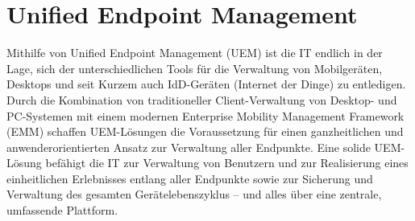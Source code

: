 \section{Unified Endpoint Management}
Mithilfe von Unified Endpoint Management (UEM) ist die IT endlich in der Lage, sich der unterschiedlichen Tools für die Verwaltung von Mobilgeräten, Desktops und seit Kurzem auch IdD-Geräten (Internet der Dinge) zu entledigen. Durch die Kombination von traditioneller Client-Verwaltung von Desktop- und PC-Systemen mit einem modernen Enterprise Mobility Management Framework (EMM) schaffen UEM-Lösungen die Voraussetzung für einen ganzheitlichen und anwenderorientierten Ansatz zur Verwaltung aller Endpunkte. Eine solide UEM-Lösung befähigt die IT zur Verwaltung von Benutzern und zur Realisierung eines einheitlichen Erlebnisses entlang aller Endpunkte sowie zur Sicherung und Verwaltung des gesamten Gerätelebenszyklus – und alles über eine zentrale, umfassende Plattform. 






